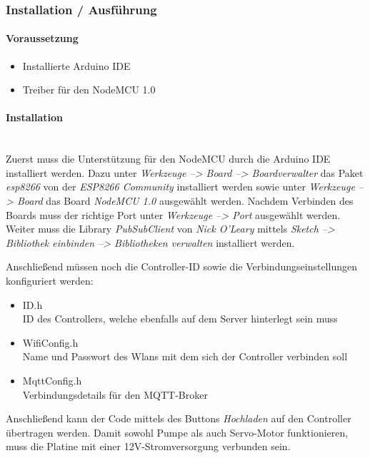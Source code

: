     \subsubsection{Installation / Ausführung}
    
    \paragraph*{Voraussetzung}
    \begin{itemize}
        \item Installierte Arduino IDE
        \item Treiber für den NodeMCU 1.0
    \end{itemize}

    \paragraph*{Installation}\mbox{}\\
    Zuerst muss die Unterstützung für den NodeMCU durch die Arduino IDE installiert werden. Dazu unter \textit{Werkzeuge --> Board --> Boardverwalter} das Paket \textit{esp8266} von der \textit{ESP8266 Community} installiert werden sowie unter \textit{Werkzeuge --> Board} das Board \textit{NodeMCU 1.0} ausgewählt werden. Nachdem Verbinden des Boards muss der richtige Port unter \textit{Werkzeuge --> Port} ausgewählt werden. Weiter muss die Library \textit{PubSubClient} von \textit{Nick O'Leary} mittels \textit{Sketch --> Bibliothek einbinden --> Bibliotheken verwalten} installiert werden.
    
    Anschließend müssen noch die Controller-ID sowie die Verbindungseinstellungen konfiguriert werden:
    \begin{itemize}
        \item ID.h\\
        ID des Controllers, welche ebenfalls auf dem Server hinterlegt sein muss
        \item WifiConfig.h\\
        Name und Passwort des Wlans mit dem sich der Controller verbinden soll
        \item MqttConfig.h\\
        Verbindungsdetails für den MQTT-Broker
    \end{itemize}

    Anschließend kann der Code mittels des Buttons \textit{Hochladen} auf den Controller übertragen werden. Damit sowohl Pumpe als auch Servo-Motor funktionieren, muss die Platine mit einer 12V-Stromversorgung verbunden sein.
    
     
    